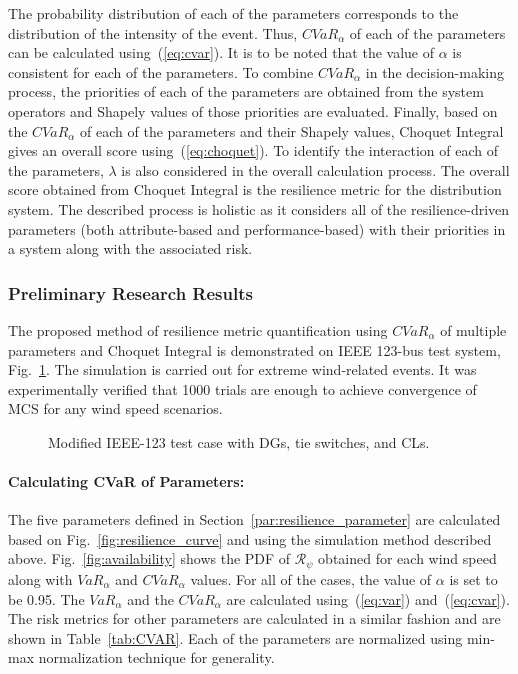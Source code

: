 The probability distribution of each of the parameters corresponds to the distribution of the intensity of the event. Thus, $CVaR_\alpha$ of each of the parameters can be calculated using~(\ref{eq:cvar}). It is to be noted that the value of $\alpha$ is consistent for each of the parameters. To combine $CVaR_\alpha$ in the decision-making process, the priorities of each of the parameters are obtained from the system operators and Shapely values of those priorities are evaluated. Finally, based on the $CVaR_\alpha$ of each of the parameters and their Shapely values, Choquet Integral gives an overall score using~(\ref{eq:choquet}). To identify the interaction of each of the parameters, $\lambda$ is also considered in the overall calculation process. The overall score obtained from Choquet Integral is the resilience metric for the distribution system. The described process is holistic as it considers all of the resilience-driven parameters (both attribute-based and performance-based) with their priorities in a system along with the associated risk.  

\subsubsection{Preliminary Research Results}
The proposed method of resilience metric quantification using $CVaR_\alpha$ of multiple parameters and Choquet Integral is demonstrated on IEEE 123-bus test system, Fig.~\ref{fig:IEEE_123_testcase}. The simulation is carried out for extreme wind-related events. It was experimentally verified that 1000 trials are enough to achieve convergence of MCS for any wind speed scenarios.

\begin{figure}
    \centering
    \caption{Modified IEEE-123 test case with DGs, tie switches, and CLs.}
    \label{fig:IEEE_123_testcase}
\end{figure}

\paragraph{Calculating CVaR of Parameters:}
The five parameters defined in Section~\ref{par:resilience_parameter} are calculated based on Fig.~\ref{fig:resilience_curve} and using the simulation method described above. Fig.~\ref{fig:availability} shows the PDF of $\mathcal{R}_\psi$ obtained for each wind speed along with $VaR_\alpha$ and $CVaR_\alpha$ values. For all of the cases, the value of $\alpha$ is set to be 0.95. The $VaR_\alpha$ and the $CVaR_\alpha$ are calculated using~(\ref{eq:var}) and~(\ref{eq:cvar}). The risk metrics for other parameters are calculated in a similar fashion and are shown in Table~\ref{tab:CVAR}. Each of the parameters are normalized using min-max normalization technique for generality.  

